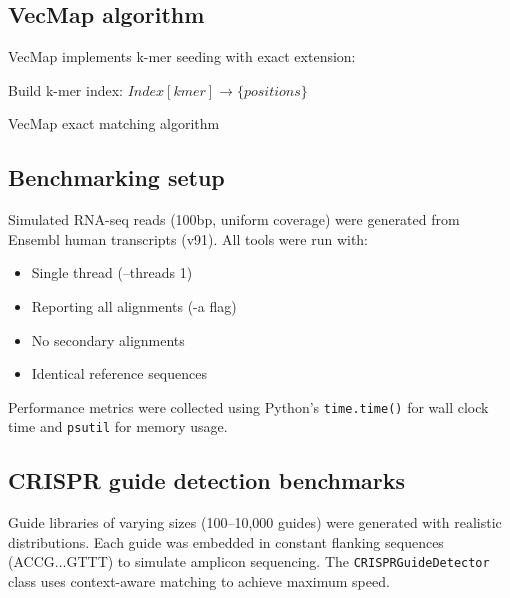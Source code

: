 \documentclass[12pt]{article}
\begin{document}
\subsection{VecMap algorithm}

VecMap implements k-mer seeding with exact extension:

\begin{algorithm}[H]
\SetAlgoLined
{}
Build k-mer index: $Index[kmer] \rightarrow \{positions\}$\;
\caption{VecMap exact matching algorithm}
\end{algorithm}

\subsection{Benchmarking setup}

Simulated RNA-seq reads (100bp, uniform coverage) were generated from Ensembl human transcripts (v91). All tools were run with:
\begin{itemize}
\item Single thread (--threads 1)
\item Reporting all alignments (-a flag)
\item No secondary alignments
\item Identical reference sequences
\end{itemize}

Performance metrics were collected using Python's \texttt{time.time()} for wall clock time and \texttt{psutil} for memory usage.

\subsection{CRISPR guide detection benchmarks}

Guide libraries of varying sizes (100--10,000 guides) were generated with realistic distributions. Each guide was embedded in constant flanking sequences (ACCG...GTTT) to simulate amplicon sequencing. The \texttt{CRISPRGuideDetector} class uses context-aware matching to achieve maximum speed.
\end{document}
